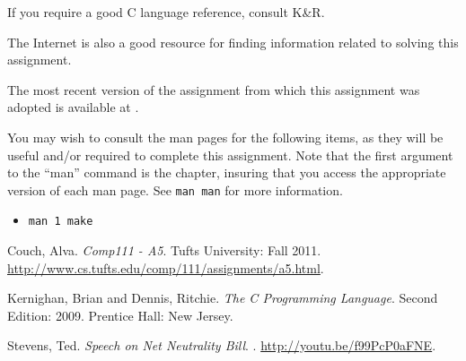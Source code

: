\documentclass[12pt]{article}
\begin{document}
If you require a good C language reference, consult K\&R\cite{K+R}.

The Internet\cite{tubes} is also a good resource for finding
information related to solving this assignment.

The most recent version of the assignment from which this assignment
was adopted is available at \cite{couch-a5}.

You may wish to consult the man pages for the following items, as they
will be useful and/or required to complete this assignment. Note that
the first argument to the ``man'' command is the chapter, insuring
that you access the appropriate version of each man page. See
\texttt{man man} for more information.

\begin{itemize}
\item \texttt{man 1 make}
\end{itemize}

\begin{thebibliography}{9}

 Couch, Alva.
  \newblock \emph{Comp111 - A5}.
  \newblock Tufts University: Fall 2011.
  \newblock \url{http://www.cs.tufts.edu/comp/111/assignments/a5.html}.

 Kernighan, Brian and Dennis, Ritchie.
  \newblock \emph{The C Programming Language}.
  \newblock Second Edition: 2009.
  \newblock Prentice Hall: New Jersey.

 Stevens, Ted.
  \newblock \emph{Speech on Net Neutrality Bill}.
  .
  \newblock \url{http://youtu.be/f99PcP0aFNE}.

\end{thebibliography}
\end{document}
